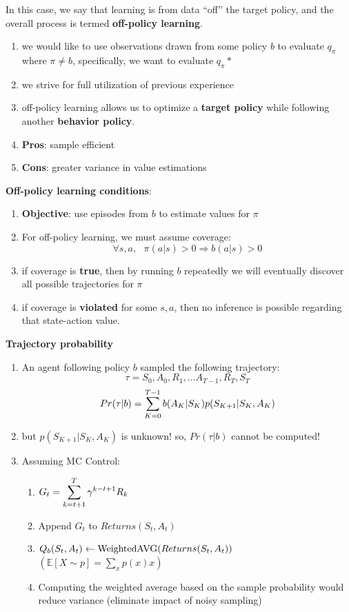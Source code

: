 In this case, we say that learning is from data “off” the target policy, and the overall process is termed \textbf{off-policy learning}.


\begin{enumerate}
    \item we would like to use observations drawn from some policy $b$ to evaluate $q_\pi$ where $\pi \neq b$, specifically, we want to evaluate $q_\pi *$
    \item we strive for full utilization of previous experience
    \item off-policy learning allows us to optimize a \textbf{target policy} while following another \textbf{behavior policy}.
    \item \textbf{Pros}: sample efficient
    \item \textbf{Cons}: greater variance in value estimations
\end{enumerate}

\vspace{0.3cm}
\textbf{Off-policy learning conditions}:
\begin{enumerate}
    \item \textbf{Objective}: use episodes from $b$ to estimate values for $\pi$
    \item For off-policy learning, we must assume coverage:
    \[
        \forall s,a, \text{ } \pi(a|s)>0 \Rightarrow b(a|s) > 0
    \]
    \item if coverage is \textbf{true}, then by running $b$ repeatedly we will eventually discover all possible trajectories for $\pi$
    \item if coverage is \textbf{violated} for some $s,a$, then no inference is possible regarding that state-action value.
\end{enumerate}

\vspace{0.3cm}
\textbf{Trajectory probability}
\begin{enumerate}
    \item An agent following policy $b$ sampled the following trajectory:
    \[
        \tau = {S_0,A_0,R_1,...A_{T-1},R_T,S_T}
    \]
    \[
        Pr(\tau|b) = \displaystyle\sum_{K=0}^{T-1} b(A_K|S_K)p(S_{K+1}|S_K,A_K) 
    \]
    \item but $p(S_{K+1}|S_K,A_K)$ is unknown! so, $Pr(\tau|b)$ cannot be computed!
    \item Assuming MC Control:
    \begin{enumerate}
        \item \(G_t = \displaystyle\sum_{k=t+1}^{T} \gamma^{k-t+1}R_k\)
        \item Append $G_t$ to $Returns(S_t,A_t)$
        \item $Q_b(S_t,A_t) \leftarrow \operatorname{WeightedAVG}(Returns(S_t,A_t))$ \hfill \( \left( \displaystyle \mathbb{E}[X \sim p] = \sum_x p(x)x \right) \)
        \item Computing the weighted average based on the sample probability would reduce variance (eliminate impact of noisy sampling)
    \end{enumerate}
    
\end{enumerate}


